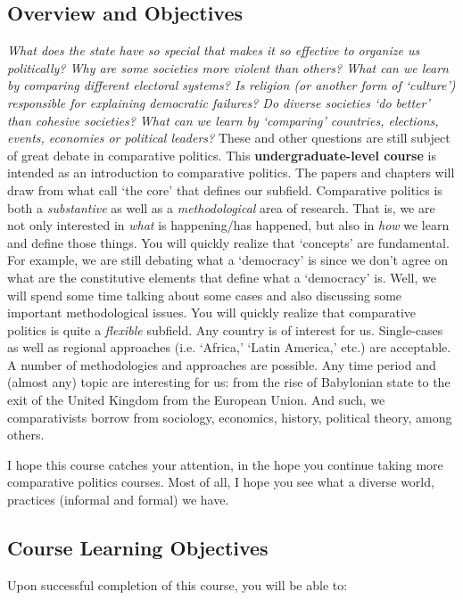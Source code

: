 \documentclass[letterpaper]{article}
\begin{document}
\subsection*{Overview and Objectives}

\emph{What does the state have so special that makes it so effective to organize us politically? Why are some societies more violent than others? What can we learn by comparing different electoral systems? Is religion (or another form of `culture') responsible for explaining democratic failures? Do diverse societies `do better' than cohesive societies? What can we learn by `comparing' countries, elections, events, economies or political leaders?} These and other questions are still subject of great debate in comparative politics. This {\bf {\color{blue}undergraduate-level course}} is intended as an introduction to comparative politics. The papers and chapters will draw from what call `the core' that defines our subfield. Comparative politics is both a \emph{substantive} as well as a \emph{methodological} area of research. That is, we are not only interested in \emph{what} is happening/has happened, but also in \emph{how} we learn and define those things. You will quickly realize that `concepts' are fundamental. For example, we are still debating what a `democracy' is since we don't agree on what are the constitutive elements that define what a `democracy' is. Well, we will spend some time talking about some cases and also discussing some important methodological issues. You will quickly realize that comparative politics is quite a \emph{flexible} subfield. Any country is of interest for us. Single-cases as well as regional approaches (i.e. `Africa,' `Latin America,' etc.) are acceptable. A number of methodologies and approaches are possible. Any time period and (almost any) topic are interesting for us: from the rise of Babylonian state to the exit of the United Kingdom from the European Union. And such, we comparativists borrow from sociology, economics, history, political theory, among others. 


I hope this course catches your attention, in the hope you continue taking more comparative politics courses. Most of all, I hope you see what a diverse world, practices (informal and formal) we have. 

\subsection*{Course Learning Objectives}
 
Upon successful completion of this course, you will be able to:
\end{document}
